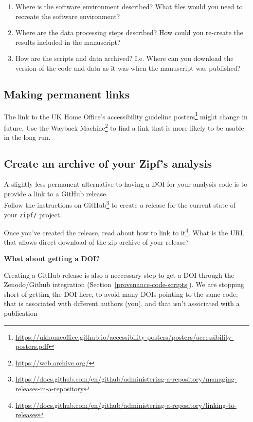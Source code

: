 \documentclass[
]{krantz}
\providecommand{\tightlist}{%
  \setlength{\itemsep}{0pt}\setlength{\parskip}{0pt}}
\renewenvironment{quote}{\begin{VF}}{\end{VF}}
\renewcommand{\href}[2]{#2\footnote{\url{#1}}}
\begin{document}
\begin{enumerate}
\def\labelenumi{\arabic{enumi}.}
\tightlist
\item
  Where is the software environment described? What files would you need to recreate the software environment?
\item
  Where are the data processing steps described? How could you re-create the results included in the manuscript?
\item
  How are the scripts and data archived?
  I.e. Where can you download the version of the code and data as it was when the manuscript was published?
\end{enumerate}

\hypertarget{provenance-ex-permanent-links}{%
\subsection{Making permanent links}\label{provenance-ex-permanent-links}}

The link to the UK Home Office's \href{https://ukhomeoffice.github.io/accessibility-posters/posters/accessibility-posters.pdf}{accessibility guideline posters} might change in future.
Use the \href{https://web.archive.org/}{Wayback Machine} to find a link that is more likely to be usable in the long run.

\hypertarget{provenance-ex-release}{%
\subsection{Create an archive of your Zipf's analysis}\label{provenance-ex-release}}

A slightly less permanent alternative to having a DOI for your analysis code
is to provide a link to a GitHub release.\\
Follow \href{https://docs.github.com/en/github/administering-a-repository/managing-releases-in-a-repository}{the instructions on GitHub} to create a release for the current state of your \texttt{zipf/} project.

Once you've created the release,
\href{https://docs.github.com/en/github/administering-a-repository/linking-to-releases}{read about how to link to it}.
What is the URL that allows direct download of the zip archive
of your release?

\begin{quote}
\textbf{What about getting a DOI?}

Creating a GitHub release is also a neccessary step
to get a DOI through the Zenodo/Github integration
(Section~\ref{provenance-code-scripts}).
We are stopping short of getting the DOI here,
to avoid many DOIs pointing to the same code,
that is associated with different authors (you),
and that isn't associated with a publication
\end{quote}
\end{document}

